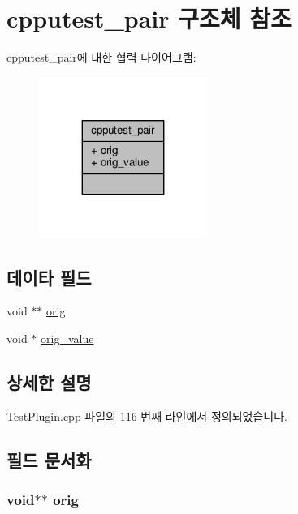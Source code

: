 \hypertarget{structcpputest__pair}{}\section{cpputest\+\_\+pair 구조체 참조}
\label{structcpputest__pair}


cpputest\+\_\+pair에 대한 협력 다이어그램\+:
\nopagebreak
\begin{figure}[H]
\begin{center}
\leavevmode
\includegraphics[width=155pt]{structcpputest__pair__coll__graph}
\end{center}
\end{figure}
\subsection*{데이타 필드}
\begin{DoxyCompactItemize}
\item 
void $\ast$$\ast$ \hyperlink{structcpputest__pair_a21f3a140fac226a85d71618afc759493}{orig}
\item 
void $\ast$ \hyperlink{structcpputest__pair_aa3acb3ac4363ea4a9423d0ec72aed146}{orig\+\_\+value}
\end{DoxyCompactItemize}


\subsection{상세한 설명}


Test\+Plugin.\+cpp 파일의 116 번째 라인에서 정의되었습니다.



\subsection{필드 문서화}
\subsubsection[{\texorpdfstring{orig}{orig}}]{\setlength{\rightskip}{0pt plus 5cm}void$\ast$$\ast$ orig}\hypertarget{structcpputest__pair_a21f3a140fac226a85d71618afc759493}{}\label{structcpputest__pair_a21f3a140fac226a85d71618afc759493}


